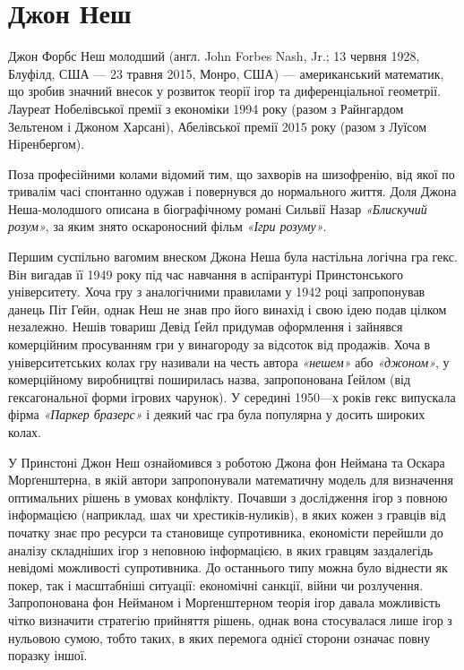 \documentclass[a4paper]{article}
\begin{document}
\clearpage
\section{Джон Неш}
Джон Форбс Неш молодший (англ. John Forbes Nash, Jr.; 13 червня 1928, Блуфілд, США — 23 травня 2015, Монро, США) — американський математик, що зробив значний внесок у розвиток теорії ігор та диференціальної геометрії. Лауреат Нобелівської премії з економіки 1994 року (разом з Райнгардом Зельтеном і Джоном Харсані), Абелівської премії 2015 року (разом з Луїсом Ніренбергом).

Поза професійними колами відомий тим, що захворів на шизофренію, від якої по тривалім часі спонтанно одужав і повернувся до нормального життя. Доля Джона Неша-молодшого описана в біографічному романі Сильвії Назар \textit{«Блискучий розум»}, за яким знято оскароносний фільм \textit{«Ігри розуму»}.

Першим суспільно вагомим внеском Джона Неша була настільна логічна гра гекс. Він вигадав її 1949 року під час навчання в аспірантурі Принстонського університету. Хоча гру з аналогічними правилами у 1942 році запропонував данець Піт Гейн, однак Неш не знав про його винахід і свою ідею подав цілком незалежно. Нешів товариш Девід Ґейл придумав оформлення і зайнявся комерційним просуванням гри у винагороду за відсоток від продажів. Хоча в університетських колах гру називали на честь автора \textit{«нешем»} або \textit{«джоном»}, у комерційному виробництві поширилась назва, запропонована Ґейлом (від гексагональної форми ігрових чарунок). У середині 1950—х років гекс випускала фірма \textit{«Паркер бразерс»} і деякий час гра була популярна у досить широких колах.

У Принстоні Джон Неш ознайомився з роботою Джона фон Неймана та Оскара Морґенштерна, в якій автори запропонували математичну модель для визначення оптимальних рішень в умовах конфлікту. Почавши з дослідження ігор з повною інформацією (наприклад, шах чи хрестиків-нуликів), в яких кожен з гравців від початку знає про ресурси та становище супротивника, економісти перейшли до аналізу складніших ігор з неповною інформацією, в яких гравцям заздалегідь невідомі можливості супротивника. До останнього типу можна було віднести як покер, так і масштабніші ситуації: економічні санкції, війни чи розлучення. Запропонована фон Нейманом і Морґенштерном теорія ігор давала можливість чітко визначити стратегію прийняття рішень, однак вона стосувалася лише ігор з нульовою сумою, тобто таких, в яких перемога однієї сторони означає повну поразку іншої.
\end{document}
